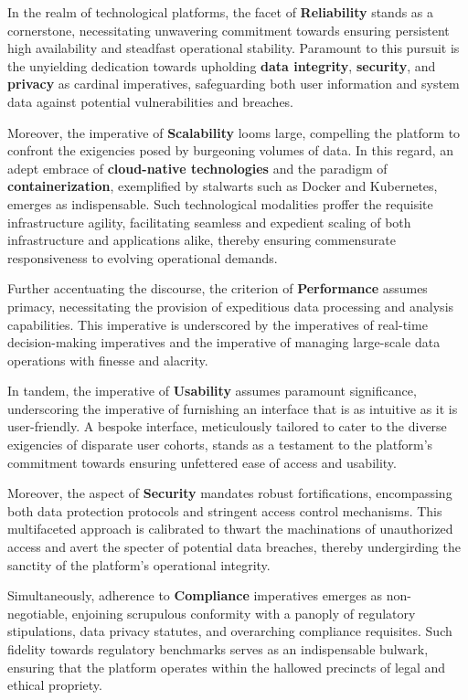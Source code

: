 In the realm of technological platforms, the facet of \textbf{Reliability}
stands as a cornerstone, necessitating unwavering commitment towards ensuring
persistent high availability and steadfast operational stability. Paramount to
this pursuit is the unyielding dedication towards upholding \textbf{data
integrity}, \textbf{security}, and \textbf{privacy} as cardinal imperatives,
safeguarding both user information and system data against potential
vulnerabilities and breaches.

Moreover, the imperative of \textbf{Scalability} looms large, compelling the
platform to confront the exigencies posed by burgeoning volumes of data. In this
regard, an adept embrace of \textbf{cloud-native technologies} and the paradigm
of \textbf{containerization}, exemplified by stalwarts such as Docker and
Kubernetes, emerges as indispensable. Such technological modalities proffer the
requisite infrastructure agility, facilitating seamless and expedient scaling of
both infrastructure and applications alike, thereby ensuring commensurate
responsiveness to evolving operational demands.

Further accentuating the discourse, the criterion of \textbf{Performance}
assumes primacy, necessitating the provision of expeditious data processing and
analysis capabilities. This imperative is underscored by the imperatives of
real-time decision-making imperatives and the imperative of managing large-scale
data operations with finesse and alacrity.

In tandem, the imperative of \textbf{Usability} assumes paramount significance,
underscoring the imperative of furnishing an interface that is as intuitive as
it is user-friendly. A bespoke interface, meticulously tailored to cater to the
diverse exigencies of disparate user cohorts, stands as a testament to the
platform's commitment towards ensuring unfettered ease of access and usability.

Moreover, the aspect of \textbf{Security} mandates robust fortifications,
encompassing both data protection protocols and stringent access control
mechanisms. This multifaceted approach is calibrated to thwart the machinations
of unauthorized access and avert the specter of potential data breaches, thereby
undergirding the sanctity of the platform's operational integrity.

Simultaneously, adherence to \textbf{Compliance} imperatives emerges as
non-negotiable, enjoining scrupulous conformity with a panoply of regulatory
stipulations, data privacy statutes, and overarching compliance requisites. Such
fidelity towards regulatory benchmarks serves as an indispensable bulwark,
ensuring that the platform operates within the hallowed precincts of legal and
ethical propriety.

